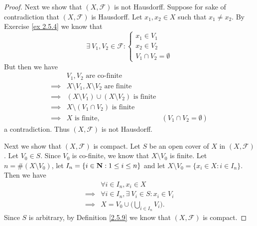 \begin{proof}
    Next we show that \((X, \mathcal{F})\) is not Hausdorff.
    Suppose for sake of contradiction that \((X, \mathcal{F})\) is Hausdorff.
    Let \(x_1, x_2 \in X\) such that \(x_1 \neq x_2\).
    By Exercise \ref{ex 2.5.4} we know that
    \[
        \exists\ V_1, V_2 \in \mathcal{F} : \begin{cases}
            x_1 \in V_1 \\
            x_2 \in V_2 \\
            V_1 \cap V_2 = \emptyset
        \end{cases}
    \]
    But then we have
    \begin{align*}
                 & V_1, V_2 \text{ are co-finite}                                                          \\
        \implies & X \setminus V_1, X \setminus V_2 \text{ are finite}                                     \\
        \implies & (X \setminus V_1) \cup (X \setminus V_2) \text{ is finite}                              \\
        \implies & X \setminus (V_1 \cap V_2) \text{ is finite}                                            \\
        \implies & X \text{ is finite},                                       & (V_1 \cap V_2 = \emptyset)
    \end{align*}
    a contradiction.
    Thus \((X, \mathcal{F})\) is not Hausdorff.

    Next we show that \((X, \mathcal{F})\) is compact.
    Let \(S\) be an open cover of \(X\) in \((X, \mathcal{F})\).
    Let \(V_0 \in S\).
    Since \(V_0\) is co-finite, we know that \(X \setminus V_0\) is finite.
    Let \(n = \#(X \setminus V_0)\), let \(I_n = \{i \in \mathbf{N} : 1 \leq i \leq n\}\) and let \(X \setminus V_0 = \{x_i \in X : i \in I_n\}\).
    Then we have
    \begin{align*}
                 & \forall i \in I_n, x_i \in X                        \\
        \implies & \forall i \in I_n, \exists\ V_i \in S : x_i \in V_i \\
        \implies & X = V_0 \cup \bigg(\bigcup_{i \in I_n} V_i\bigg).
    \end{align*}
    Since \(S\) is arbitrary, by Definition \ref{2.5.9} we know that \((X, \mathcal{F})\) is compact.


\end{proof}
